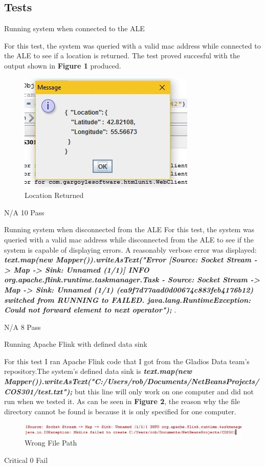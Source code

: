 \subsection{Tests}
\FuncReq
\graphicspath{ {images/} }

{Running system when connected to the ALE}
{For this test, the system was queried with a valid mac address while connected to the ALE to see if a location is returned. The test proved succesful with the output shown in \textbf{Figure 1} produced.
			\begin{figure}[h]
				\centering
				\includegraphics{right_mac.jpg}
				\caption{Location Returned}
				\label{fig:LocationReturned}
			\end{figure}
}
{N/A}
{10}
{Pass}

{Running system when disconnected from the ALE}
{For this test, the system was queried with a valid mac address while disconnected from the ALE to see if the system is capable of displaying errors. A reasonably verbose error was displayed: \textbf{\textit{ text.map(new Mapper()).writeAsText("Error
[Source: Socket Stream -> Map -> Sink: Unnamed (1/1)] INFO org.apache.flink.runtime.taskmanager.Task - Source: Socket Stream -> Map -> Sink: Unnamed (1/1) (ea9f7d77aad0d00674c883feb4176b12) switched from RUNNING to FAILED.
java.lang.RuntimeException: Could not forward element to next operator");}} .}

{N/A}
{8}
{Pass}


{Running Apache Flink with defined data sink}
{For this test I ran Apache Flink code that I got from the Gladios Data team's repository.The system's defined data sink is \textbf{\textit{  text.map(new Mapper()).writeAsText("C:/Users/rob/Documents/NetBeansProjects/COS301/test.txt");}} but this line will only work on one computer and did not run when we tested it. As can be seen in \textbf{Figure 2}, the reason why the file directory cannot be found is because it is only specified for one computer.
			\begin{figure}[h]
				\centering
				\includegraphics{wrong_file_error.jpg}
				\caption{Wrong File Path}
				\label{fig:WrongFIlePath}
			\end{figure} }
{Critical}
{0}
{Fail}
		

